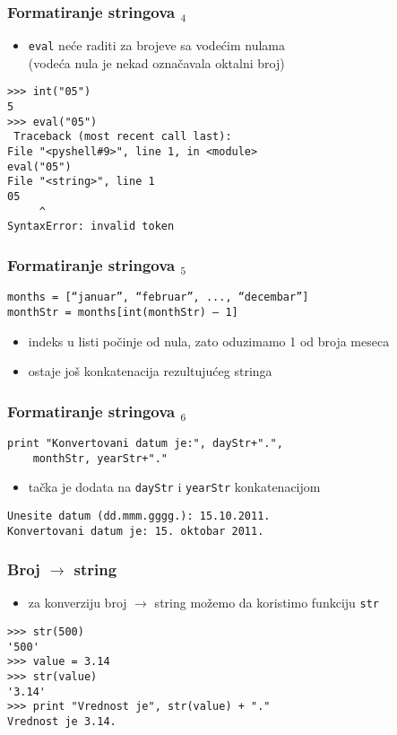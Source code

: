 \documentclass[utf8,compress]{beamer}
\begin{document}
\begin{frame}[fragile]
  \frametitle{Formatiranje stringova $_4$}
  \begin{itemize}
    \item \texttt{eval} neće raditi za brojeve sa vodećim nulama\\ (vodeća nula je nekad označavala oktalni broj)
  \end{itemize}
\begin{verbatim}
>>> int("05")
5
>>> eval("05")
 Traceback (most recent call last):
File "<pyshell#9>", line 1, in <module>
eval("05")
File "<string>", line 1
05
     ^
SyntaxError: invalid token
\end{verbatim}
\end{frame}

\begin{frame}[fragile]
  \frametitle{Formatiranje stringova $_5$}
\begin{verbatim}
months = [“januar”, “februar”, ..., “decembar”]
monthStr = months[int(monthStr) – 1]
\end{verbatim}
  \begin{itemize}
    \item indeks u listi počinje od nula, zato oduzimamo 1 od broja meseca
    \item ostaje još konkatenacija rezultujućeg stringa
  \end{itemize}
\end{frame}

\begin{frame}[fragile]
  \frametitle{Formatiranje stringova $_6$}
\begin{verbatim}
print "Konvertovani datum je:", dayStr+".", 
    monthStr, yearStr+"."
\end{verbatim}
  \begin{itemize}
    \item tačka je dodata na \texttt{dayStr} i \texttt{yearStr} konkatenacijom
  \end{itemize}
\begin{verbatim}
Unesite datum (dd.mmm.gggg.): 15.10.2011.
Konvertovani datum je: 15. oktobar 2011.
\end{verbatim}
\end{frame}

\begin{frame}[fragile]
  \frametitle{Broj $\rightarrow$ string}
  \begin{itemize}
    \item za konverziju broj $\rightarrow$ string možemo da koristimo funkciju \texttt{str}
  \end{itemize}
\begin{verbatim}
>>> str(500)
'500'
>>> value = 3.14
>>> str(value)
'3.14'
>>> print "Vrednost je", str(value) + "."
Vrednost je 3.14.
\end{verbatim}
\end{frame}
\end{document}
